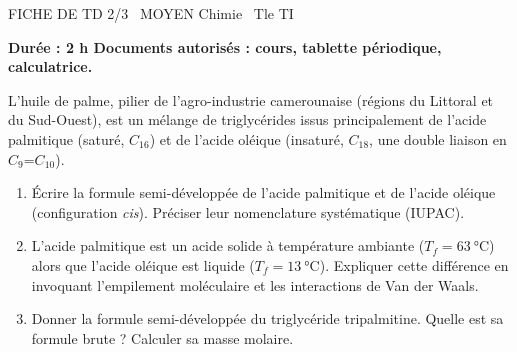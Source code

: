 \documentclass[11pt]{article}
\begin{document}
\begin{tcolorbox}[enhanced,colback=popink,colframe=popink,arc=10pt,boxrule=0pt,left=12pt,right=12pt,top=9pt,bottom=9pt]
{\color{white}\popxbold\small FICHE DE TD 2/3 \textbullet\ MOYEN \hfill Chimie \textbullet\ Tle TI\par}
\end{tcolorbox}
\vspace{4pt}
\textbf{Durée : 2 h \quad Documents autorisés : cours, tablette périodique, calculatrice.}

\begin{exercice}
L'huile de palme, pilier de l'agro-industrie camerounaise (régions du Littoral et du Sud-Ouest), est un mélange de triglycérides issus principalement de l'acide palmitique (saturé, $C_{16}$) et de l'acide oléique (insaturé, $C_{18}$, une double liaison en $C_9$=$C_{10}$).
\begin{enumerate}
    \item Écrire la formule semi-développée de l'acide palmitique et de l'acide oléique (configuration \textit{cis}). Préciser leur nomenclature systématique (IUPAC).
    \item L'acide palmitique est un acide solide à température ambiante ($T_f = \SI{63}{\celsius}$) alors que l'acide oléique est liquide ($T_f = \SI{13}{\celsius}$). Expliquer cette différence en invoquant l'empilement moléculaire et les interactions de Van der Waals.
    \item Donner la formule semi-développée du triglycéride tripalmitine. Quelle est sa formule brute ? Calculer sa masse molaire.
\end{enumerate}
\end{exercice}
\end{document}
